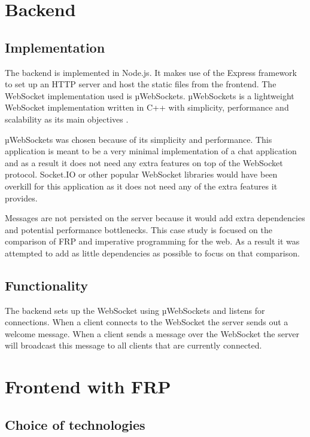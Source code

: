 \section{Backend}

\subsection{Implementation}

The backend is implemented in Node.js. It makes use of the Express framework to set up an HTTP server and host the static files from the frontend. The WebSocket implementation used is µWebSockets. µWebSockets is a lightweight WebSocket implementation written in C++ with simplicity, performance and scalability as its main objectives \cite{uws}.

µWebSockets was chosen because of its simplicity and performance. This application is meant to be a very minimal implementation of a chat application and as a result it does not need any extra features on top of the WebSocket protocol. Socket.IO or other popular WebSocket libraries would have been overkill for this application as it does not need any of the extra features it provides.

Messages are not persisted on the server because it would add extra dependencies and potential performance bottlenecks. This case study is focused on the comparison of FRP and imperative programming for the web. As a result it was attempted to add as little dependencies as possible to focus on that comparison.

\subsection{Functionality}

The backend sets up the WebSocket using µWebSockets and listens for connections. When a client connects to the WebSocket the server sends out a welcome message. When a client sends a message over the WebSocket the server will broadcast this message to all clients that are currently connected.

\section{Frontend with FRP}
\label{sec:imp-frp}

\subsection{Choice of technologies}

